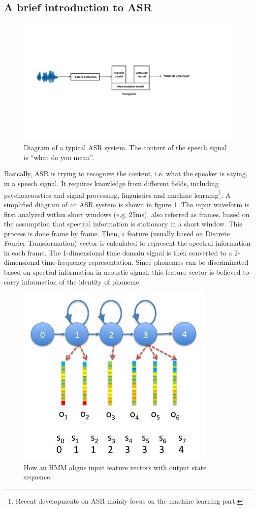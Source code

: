 \subsection{A brief introduction to ASR}

\begin{figure}[t]
\centering
\captionsetup{justification=centering}
\includegraphics[width = 1.0\linewidth]{figures/ASR_diagram.pdf}
\caption{Diagram of a typical ASR system. The content of the speech signal is ``what do you mean''.}
\label{fig:asr_diagram}
\end{figure}

 Basically, ASR is trying to recognize the content, i.e. what the speaker is saying, in a speech signal. It requires knowledge from different fields, including psychoacoustics and signal processing, linguistics and machine learning\footnote{Recent developments on ASR mainly focus on the machine learning part.}. A simplified diagram of an ASR system is shown in figure \ref{fig:asr_diagram}. The input waveform is first analyzed within short windows (e.g. 25ms), also referred as frames, based on the assumption that spectral information is stationary in a short window. This process is done frame by frame. Then, a feature (usually based on Discrete Fourier Transformation) vector is calculated to represent the spectral information in each frame. The 1-dimensional time domain signal is then converted to a 2-dimensional time-frequency representation. Since phonemes can be discriminated based on spectral information in acoustic signal, this feature vector is believed to carry information of the identity of phoneme.

 \begin{figure}[t]
\centering
\captionsetup{justification=centering}
\includegraphics[width = 0.4\linewidth]{figures/HMM_state.JPG}
\caption{How an HMM aligns input feature vectors with output state sequence.}
\label{fig:hmm_diagram}
\end{figure}

